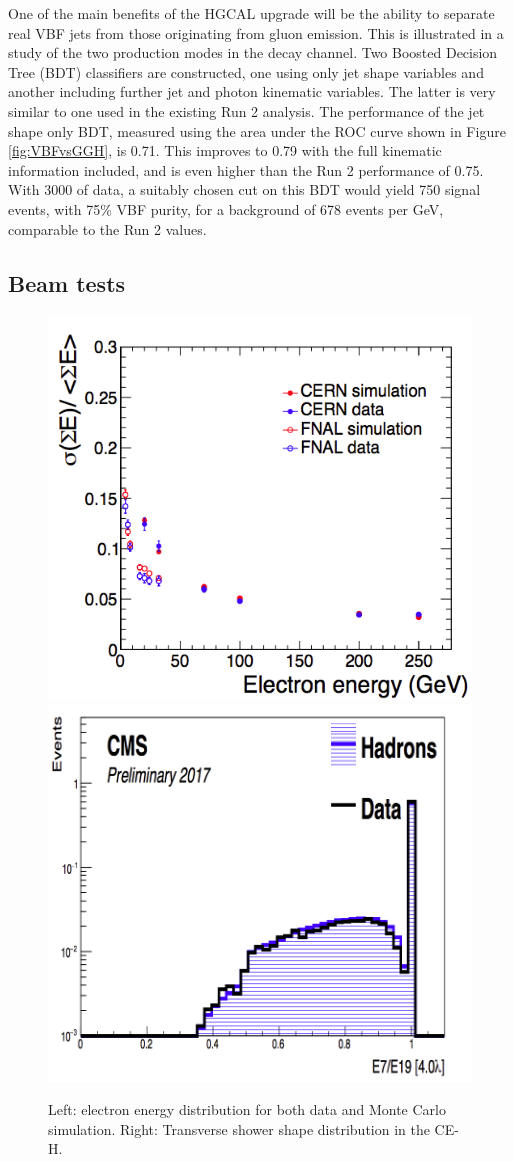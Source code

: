 One of the main benefits of the HGCAL upgrade will be the ability to separate real VBF jets from those originating from gluon emission.
This is illustrated in a study of the two production modes in the \Hgg decay channel.
Two Boosted Decision Tree (BDT) classifiers are constructed, one using only jet shape variables and another including further jet and photon kinematic variables. 
The latter is very similar to one used in the existing Run 2 analysis.
The performance of the jet shape only BDT, measured using the area under the ROC curve shown in Figure \ref{fig:VBFvsGGH}, is 0.71. 
This improves to 0.79 with the full kinematic information included, and is even higher than the Run 2 performance of 0.75. 
With \SI{3000}{\fbinv} of data, a suitably chosen cut on this BDT would yield 750 signal events, with 75\% VBF purity, for a background of 678 events per GeV, comparable to the Run 2 values. 

\subsection{Beam tests}

\begin{figure}
\centering
\includegraphics[width=.5\textwidth]{Figures/HGCAL/BeamTestElectronReso.png}
\includegraphics[width=.49\textwidth]{Figures/HGCAL/BeamTestHadronReso.png}
\caption{
Left: electron energy distribution for both data and Monte Carlo simulation.
Right: Transverse shower shape distribution in the CE-H. 
}
\label{fig:BeamTest}
\end{figure}


